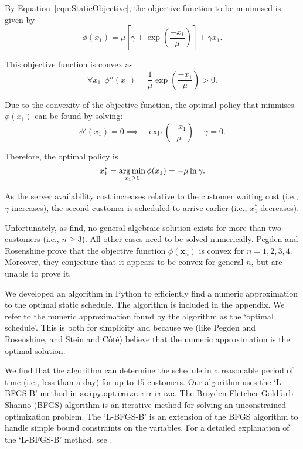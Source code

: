 By Equation~\ref{eqn:StaticObjective}, the objective function to be minimised is given by
\begin{equation}
	\phi (x_{1}) = \mu \left[ \gamma + \exp \left( \frac{- x_{1}}{\mu} \right) \right] + \gamma x_{1}.
\end{equation}

This objective function is convex as
\begin{equation}
	\forall x_{1} \ \ \phi'' (x_{1}) = \frac{1}{\mu} \exp \left( \frac{- x_{1}}{\mu} \right) > 0.
\end{equation}

Due to the convexity of the objective function, the optimal policy that minmises $\phi (x_{1})$ can be found by solving:
\begin{equation}
	\phi' (x_{1}) = 0 \implies - \exp \left( \frac{- x_{1}}{\mu} \right) + \gamma = 0.
\end{equation}

Therefore, the optimal policy is
\begin{equation}
	x_{1}^{*} = \operatorname*{arg\,min}_{x_{1} \geq 0} \phi (x_{1}) = - \mu \ln \gamma.
\end{equation}

As the server availability cost increases relative to the customer waiting cost (i.e., $\gamma$ increases), the second customer is scheduled to arrive earlier (i.e., $x_{1}^{*}$ decreases).

Unfortunately, as \citet{Pegden} find, no general algebraic solution exists for more than two customers (i.e., $n \geq 3$). All other cases need to be solved numerically. Pegden and Rosenshine prove that the objective function $\phi (\mathbf{x}_{n})$ is convex for $n = 1, 2, 3, 4$. Moreover, they conjecture that it appears to be convex for general $n$, but are unable to prove it.

We developed an algorithm in Python to efficiently find a numeric approximation to the optimal static schedule. The algorithm is included in the appendix. We refer to the numeric approximation found by the algorithm as the `optimal schedule'. This is both for simplicity and because we (like Pegden and Rosenshine, and Stein and C\^{o}t\'{e}) believe that the numeric approximation is the optimal solution.

We find that the algorithm can determine the schedule in a reasonable period of time (i.e., less than a day) for up to $15$ customers. Our algorithm uses the `L-BFGS-B' method in $\texttt{scipy.optimize.minimize}$. The Broyden-Fletcher-Goldfarb-Shanno (BFGS) algorithm is an iterative method for solving an unconstrained optimization problem. The `L-BFGS-B' is an extension of the BFGS algorithm to handle simple bound constraints on the variables. For a detailed explanation of the `L-BFGS-B' method, see \citet{Byrd}.

